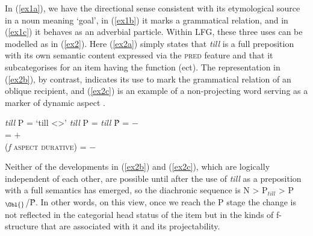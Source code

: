 \documentclass[output=paper]{langsci/langscibook}
\begin{document}
In (\ref{ex1a}), we have the directional sense consistent with its etymological
source in a noun meaning `goal', in (\ref{ex1b}) it marks a grammatical
relation, and in (\ref{ex1c}) it behaves as an adverbial particle. Within
\gls{LFG}, these three uses can be modelled as in (\ref{ex2}). Here
(\ref{ex2a}) simply states that  \emph{till} is a full preposition with its own
semantic content expressed via the \textsc{pred} feature and that it
subcategorises for an item having the function \Obj{}(ect). The representation
in (\ref{ex2b}), by contrast, indicates its use to mark the grammatical relation
of an oblique recipient, and  (\ref{ex2c}) is an example of a non-projecting
word serving as a marker of dynamic aspect \citep[142]{Toivonen03}.

\begin{exe}
\ex\label{ex2}
\begin{xlist}
\ex\label{ex2a}
\emph{till}\hspace{0.3cm} P\hspace{0.3cm}  = `till <\Obj{}>'
\ex\label{ex2b}
\emph{till}\hspace{0.3cm} P\hspace{0.3cm}  =
\Obl{}
\ex\label{ex2c}
\emph{till}\hspace{0.3cm} \^P\hspace{0.3cm}  = $-$\\
 = $+$\\
 (\emph{f} \textsc{aspect durative}) = $-$
\end{xlist}
\end{exe}

Neither of the developments in (\ref{ex2b}) and (\ref{ex2c}), which are
logically independent of each other, are possible until after the use of
\emph{till} as a preposition with a full semantics has emerged, so the
diachronic sequence is N > P$_{till}$ > P$_{\Obl{}}$/\^P. In other words,
on this view, once we reach the P stage the change is not reflected in the
categorial head status of the item but in the kinds of f-structure that are
associated with it and its projectability.
\end{document}
